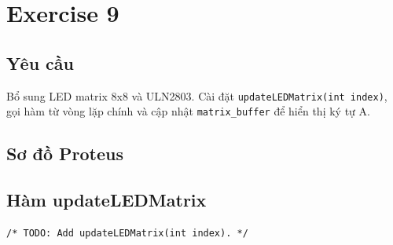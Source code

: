 \section{Exercise 9}

\subsection{Yêu cầu}
Bổ sung LED matrix 8x8 và ULN2803. Cài đặt
\texttt{updateLEDMatrix(int index)}, gọi hàm từ vòng lặp chính và cập nhật
\texttt{matrix\_buffer} để hiển thị ký tự A.

\subsection{Sơ đồ Proteus}

\subsection{Hàm updateLEDMatrix}
\begin{lstlisting}[caption={updateLEDMatrix -- Exercise 9}]
/* TODO: Add updateLEDMatrix(int index). */
\end{lstlisting}
